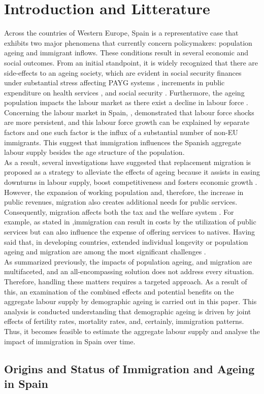 \section{Introduction and Litterature}

Across the countries of Western Europe, Spain is a representative case that exhibits two major phenomena that currently concern policymakers: population ageing and immigrant inflows. These conditions result in several economic and social outcomes. From an initial standpoint, it is widely recognized that there are side-effects to an ageing society, which are evident in social security finances under substantial stress affecting PAYG systems \citep{ diaz2009delaying,boeri2024pay}, increments in public expenditure on health services \citep{cristea2020impact, aiyar2016impact, bijak2007population}, and social security \citep{failde2021perspective}. Furthermore, the ageing population impacts the labour market as there exist a decline in labour force \citep{maestas2023effect}. Concerning the labour market in Spain, \citep{casares2018labor}, demonstrated that labour force shocks are more persistent, and this labour force growth can be explained by separate factors and one such factor is the influx of a substantial number of non-EU immigrants. This suggest that immigration influences the Spanish aggregate labour supply besides the age structure of the population. \\

As a result, several investigations have suggested that replacement migration is proposed as a strategy to alleviate the effects of ageing because it assists in easing downturns in labour supply, boost competitiveness and fosters economic growth \citep{stepanek2022sectoral, okamoto2021immigration, UNATIONS}. However, the expansion of working population and, therefore, the increase in public revenues, migration also creates additional needs for public services. Consequently, migration affects both the tax and the welfare system \citep{fiorio2023migration, naumann2021population}. For example, as stated in \citep{ preston2014effect},immigration can result in costs by the utilization of public services but can also influence the expense of offering services to natives. Having said that, in developing countries, extended individual longevity or population ageing and migration are among the most significant challenges \citep{ciobanu2020intersections}. \\

As summarized previously, the impacts of population ageing, and migration are multifaceted, and an all-encompassing solution does not address every situation. Therefore, handling these matters requires a targeted approach. As a result of this, an examination of the combined effects and potential benefits on the aggregate labour supply by demographic ageing is carried out in this paper. This analysis is conducted understanding that demographic ageing is driven by joint effects of fertility rates, mortality rates, and, certainly, immigration patterns. Thus, it becomes feasible to estimate the aggregate labour supply and analyse the impact of immigration in Spain over time. 


\subsection*{Origins and Status of Immigration and Ageing in Spain}

